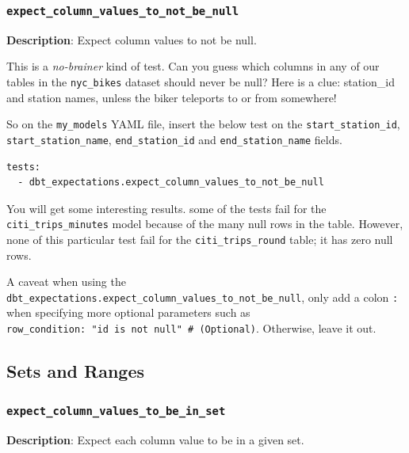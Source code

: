 \documentclass[
]{book}
\begin{document}
\hypertarget{expect_column_values_to_not_be_null}{%
\subsubsection{\texorpdfstring{\texttt{expect\_column\_values\_to\_not\_be\_null}}{expect\_column\_values\_to\_not\_be\_null}}\label{expect_column_values_to_not_be_null}}

\textbf{Description}: Expect column values to not be null.

This is a \emph{no-brainer} kind of test. Can you guess which columns in any of our tables in the \texttt{nyc\_bikes} dataset should never be null? Here is a clue: station\_id and station names, unless the biker teleports to or from somewhere!

So on the \texttt{my\_models} YAML file, insert the below test on the \texttt{start\_station\_id}, \texttt{start\_station\_name}, \texttt{end\_station\_id} and \texttt{end\_station\_name} fields.

\begin{verbatim}
tests:
  - dbt_expectations.expect_column_values_to_not_be_null
\end{verbatim}

You will get some interesting results. some of the tests fail for the \texttt{citi\_trips\_minutes} model because of the many null rows in the table. However, none of this particular test fail for the \texttt{citi\_trips\_round} table; it has zero null rows.

A caveat when using the \texttt{dbt\_expectations.expect\_column\_values\_to\_not\_be\_null}, only add a colon \texttt{:} when specifying more optional parameters such as \texttt{row\_condition:\ "id\ is\ not\ null"\ \#\ (Optional)}. Otherwise, leave it out.

\hypertarget{sets-and-ranges}{%
\subsection{Sets and Ranges}\label{sets-and-ranges}}

\hypertarget{expect_column_values_to_be_in_set}{%
\subsubsection{\texorpdfstring{\texttt{expect\_column\_values\_to\_be\_in\_set}}{expect\_column\_values\_to\_be\_in\_set}}\label{expect_column_values_to_be_in_set}}

\textbf{Description}: Expect each column value to be in a given set.
\end{document}
